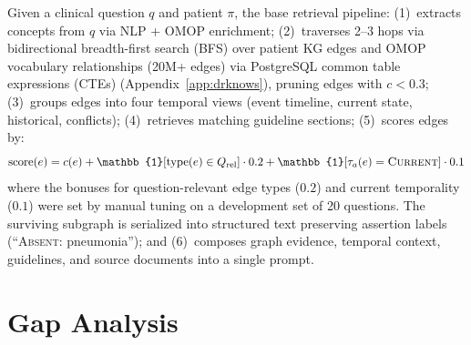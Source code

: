 Given a clinical question $q$ and patient $\pi$, the base retrieval pipeline:
(1)~extracts concepts from $q$ via NLP + OMOP enrichment;
(2)~traverses 2--3 hops via bidirectional breadth-first search (BFS) over patient KG edges and OMOP vocabulary relationships (20M+ edges) via PostgreSQL common table expressions (CTEs) (Appendix~\ref{app:drknows}), pruning edges with $c < 0.3$;
(3)~groups edges into four temporal views (event timeline, current state, historical, conflicts);
(4)~retrieves matching guideline sections;
(5)~scores edges by:
\begin{equation}
\label{eq:scoring}
\text{score}(e) = c(e) + \mathbb{1}[\text{type}(e) \in Q_{\text{rel}}] \cdot 0.2 + \mathbb{1}[\tau_a(e) = \textsc{Current}] \cdot 0.1
\end{equation}
where the bonuses for question-relevant edge types ($0.2$) and current temporality ($0.1$) were set by manual tuning on a development set of 20 questions.
The surviving subgraph is serialized into structured text preserving assertion labels (\eg ``\textsc{Absent}: pneumonia'');
and (6)~composes graph evidence, temporal context, guidelines, and source documents into a single prompt.


\section{Gap Analysis}
\label{app:gap}

